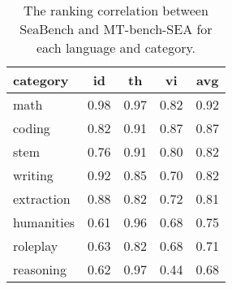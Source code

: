 \begin{table}[h!]
\centering
\small
    \begin{tabular}{lcccc}
        \toprule
        category & \textbf{id} & \textbf{th} & \textbf{vi} & \textbf{avg} \\ 
        \midrule
        math & 0.98 & 0.97 & 0.82 & 0.92 \\ 
        coding & 0.82 & 0.91 & 0.87 & 0.87 \\ 
        stem & 0.76 & 0.91 & 0.80 & 0.82 \\ 
        writing & 0.92 & 0.85 & 0.70 & 0.82 \\ 
        extraction & 0.88 & 0.82 & 0.72 & 0.81 \\ 
        humanities & 0.61 & 0.96 & 0.68 & 0.75 \\ 
        roleplay & 0.63 & 0.82 & 0.68 & 0.71 \\ 
        reasoning & 0.62 & 0.97 & 0.44 & 0.68 \\ 
        \bottomrule
    \end{tabular}
\caption{The ranking correlation between SeaBench and MT-bench-SEA for each language and category.}
\label{tab:corr_seabench_cate}
\end{table}